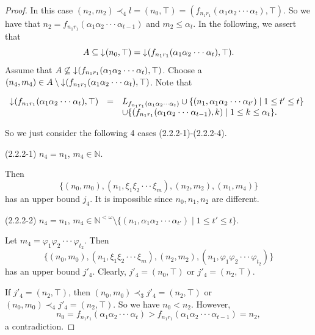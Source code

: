 \documentclass[preprint,12pt]{elsarticle}
\numberwithin{equation}{section}
\newcommand{\dn}{\mathord{\downarrow}\hspace{0.05em}}
\begin{document}
\begin{proof}
In this case $(n_{2},m_{2})\prec_{4}l=(n_{0},\top)=(f_{n_{1}r_{1}}(\alpha_{1}\alpha_{2}\cdot\cdot\cdot\alpha_{t}),\top)$. So we have that $n_{2}=f_{n_{1}r_{1}}(\alpha_{1}\alpha_{2}\cdot\cdot\cdot\alpha_{t-1})$ and $m_{2}\leq\alpha_{t}$. In the following, we assert that $$A\subseteq\dn(n_{0},\top)=\dn(f_{n_{1}r_{1}}(\alpha_{1}\alpha_{2}\cdot\cdot\cdot\alpha_{t}),\top).$$
Assume that $A\not\subseteq\dn(f_{n_{1}r_{1}}(\alpha_{1}\alpha_{2}\cdot\cdot\cdot\alpha_{t}),\top)$. Choose a $(n_{4},m_{4})\in A\setminus\dn(f_{n_{1}r_{1}}(\alpha_{1}\alpha_{2}\cdot\cdot\cdot\alpha_{t}),\top)$. Note that
\begin{center}$\begin{array}{lll}
\dn(f_{n_{1}r_{1}}(\alpha_{1}\alpha_{2}\cdot\cdot\cdot\alpha_{t}),\top)&=&L_{f_{n_{1}r_{1}}(\alpha_{1}\alpha_{2}\cdot\cdot\cdot\alpha_{t})}\cup\{(n_{1},\alpha_{1}\alpha_{2}\cdot\cdot\cdot\alpha_{t'})\mid 1\leq t'\leq t\} \\
&&\cup\{(f_{n_{1}r_{1}}(\alpha_{1}\alpha_{2}\cdot\cdot\cdot\alpha_{t-1}),k)\mid 1\leq k\leq\alpha_{t}\}.\\
\end{array}$\end{center}
So we just consider the following 4 cases (2.2.2-1)-(2.2.2-4).

(2.2.2-1) $n_{4}=n_{1}$, $m_{4}\in\mathbb{N}$.

Then
$$\{(n_{0},m_{0}),(n_{1},\xi_{1}\xi_{2}\cdot\cdot\cdot\xi_{m}),(n_{2},m_{2}),(n_{1},m_{4})\}$$ has an upper bound $j_{4}$. It is impossible since $n_{0},n_{1},n_{2}$ are different.

(2.2.2-2) $n_{4}=n_{1}$, $m_{4}\in\mathbb{N}^{<\omega}\setminus\{(n_{1},\alpha_{1}\alpha_{2}\cdot\cdot\cdot\alpha_{t'})\mid 1\leq t'\leq t\}$.

Let $m_{4}=\varphi_{1}\varphi_{2}\cdot\cdot\cdot\varphi_{t_{2}}$. Then $$\{(n_{0},m_{0}),(n_{1},\xi_{1}\xi_{2}\cdot\cdot\cdot\xi_{m}),(n_{2},m_{2}),(n_{1},\varphi_{1}\varphi_{2}\cdot\cdot\cdot\varphi_{t_{2}})\}$$ has an upper bound $j'_{4}$. Clearly, $j'_{4}=(n_{0},\top)$ or $j'_{4}=(n_{2},\top)$.

If $j'_{4}=(n_{2},\top)$, then $(n_{0},m_{0})\prec_{3}j'_{4}=(n_{2},\top)$ or $(n_{0},m_{0})\prec_{4}j'_{4}=(n_{2},\top)$. So we have $n_{0}<n_{2}$. However, $$n_{0}=f_{n_{1}r_{1}}(\alpha_{1}\alpha_{2}\cdot\cdot\cdot\alpha_{t})>f_{n_{1}r_{1}}(\alpha_{1}\alpha_{2}\cdot\cdot\cdot\alpha_{t-1})=n_{2},$$ a contradiction.


\end{proof}
\end{document}
